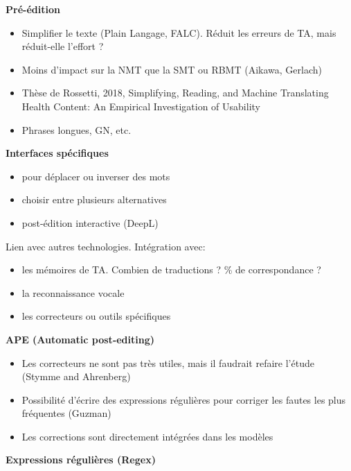 \textbf{Pré-édition}

\begin{itemize}
    \item Simplifier le texte (Plain Langage, FALC). Réduit les erreurs de TA, mais réduit-elle l’effort ?
    \item Moins d’impact sur la NMT que la SMT ou RBMT (Aikawa, Gerlach)
    \item Thèse de Rossetti, 2018, Simplifying, Reading, and Machine Translating Health Content: An Empirical Investigation of Usability
    \item Phrases longues, GN, etc.\\
\end{itemize}

\textbf{Interfaces spécifiques}

\begin{itemize}
    \item pour déplacer ou inverser des mots
    \item choisir entre plusieurs alternatives
    \item post-édition interactive (DeepL)\\
\end{itemize}

Lien avec autres technologies. Intégration avec:

\begin{itemize}
    \item les mémoires de TA. Combien de traductions ? \% de correspondance ?
    \item la reconnaissance vocale
    \item les correcteurs ou outils spécifiques\\
\end{itemize}

\textbf{APE (Automatic post-editing)}

\begin{itemize}
    \item Les correcteurs ne sont pas très utiles, mais il faudrait refaire l’étude (Stymme and Ahrenberg)
    \item Possibilité d’écrire des expressions régulières pour corriger les fautes les plus fréquentes (Guzman)
    \item Les corrections sont directement intégrées dans les modèles\\
\end{itemize}

\textbf{Expressions régulières (Regex)}

